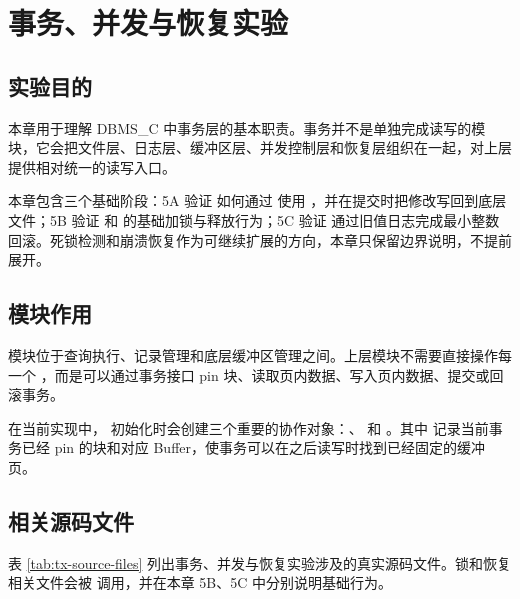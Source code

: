 \chapter{事务、并发与恢复实验}
\label{chap:tx-recovery}

\section{实验目的}
\label{sec:tx-purpose}

本章用于理解 DBMS\_C 中事务层的基本职责。事务并不是单独完成读写的模块，它会把文件层、日志层、缓冲区层、并发控制层和恢复层组织在一起，对上层提供相对统一的读写入口。

本章包含三个基础阶段：5A 验证  如何通过  使用 ，并在提交时把修改写回到底层文件；5B 验证  和  的基础加锁与释放行为；5C 验证  通过旧值日志完成最小整数回滚。死锁检测和崩溃恢复作为可继续扩展的方向，本章只保留边界说明，不提前展开。

\section{模块作用}
\label{sec:tx-role}

 模块位于查询执行、记录管理和底层缓冲区管理之间。上层模块不需要直接操作每一个 ，而是可以通过事务接口 pin 块、读取页内数据、写入页内数据、提交或回滚事务。

在当前实现中， 初始化时会创建三个重要的协作对象：、 和 。其中  记录当前事务已经 pin 的块和对应 Buffer，使事务可以在之后读写时找到已经固定的缓冲页。

\section{相关源码文件}
\label{sec:tx-source-files}

表 \ref{tab:tx-source-files} 列出事务、并发与恢复实验涉及的真实源码文件。锁和恢复相关文件会被  调用，并在本章 5B、5C 中分别说明基础行为。


